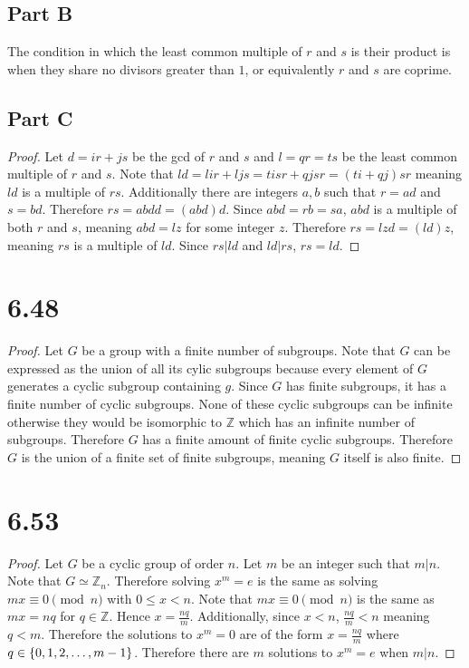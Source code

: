 \documentclass[12pt]{extarticle}
\begin{document}
\subsection*{Part B}
The condition in which the least common multiple of $r$ and $s$ is their product is when they share no divisors greater than $1$, or equivalently $r$ and $s$ are coprime.

\subsection*{Part C}
\begin{proof}
	Let $d = ir + js$ be the gcd of $r$ and $s$ and $l = qr = ts$ be the least common multiple of $r$ and $s$. Note that $ld = lir + ljs = tisr + qjsr = (ti + qj)sr$ meaning $ld$ is a multiple of $rs$. Additionally there are integers $a,b$ such that $r = ad$ and $s = bd$. Therefore $rs = abdd = (abd)d$. Since $abd = rb = sa$, $abd$ is a multiple of both $r$ and $s$, meaning $abd = lz$ for some integer $z$. Therefore $rs = lzd = (ld)z$, meaning $rs$ is a multiple of $ld$. Since $rs | ld$ and $ld | rs$, $rs = ld$.
\end{proof}


\section*{6.48}
\begin{proof}
	Let $G$ be a group with a finite number of subgroups. Note that $G$ can be expressed as the union of all its cylic subgroups because every element of $G$ generates a cyclic subgroup containing $g$. Since $G$ has finite subgroups, it has a finite number of cyclic subgroups. None of these cyclic subgroups can be infinite otherwise they would be isomorphic to $\mathbb{Z}$ which has an infinite number of subgroups. Therefore $G$ has a finite amount of finite cyclic subgroups. Therefore $G$ is the union of a finite set of finite subgroups, meaning $G$ itself is also finite.
\end{proof}

\section*{6.53}
\begin{proof}
	Let $G$ be a cyclic group of order $n$. Let $m$ be an integer such that $m | n$. Note that $G \simeq \mathbb{Z}_n$. Therefore solving $x^m = e$ is the same as solving $mx \equiv 0 \pmod{n}$ with $0 \leq x < n$. Note that $mx \equiv 0 \pmod{n}$ is the same as $mx = nq$ for $q \in \mathbb{Z}$. Hence $x = \frac{nq}{m}$. Additionally, since $x < n$, $\frac{nq}{m} < n$ meaning $q < m$. Therefore the solutions to $x^m = 0$ are of the form $x = \frac{nq}{m}$ where $q \in \qty{0,1,2,\ldots,m-1}$. Therefore there are $m$ solutions to $x^m = e$ when $m | n$.
\end{proof}
\end{document}

